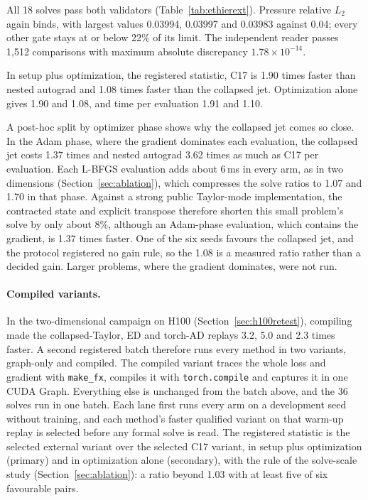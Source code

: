 \documentclass[11pt]{article}
\begin{document}
All 18 solves pass both validators (Table~\ref{tab:ethierext}). Pressure
relative $L_2$ again binds, with largest values 0.03994, 0.03997 and 0.03983
against 0.04; every other gate stays at or below 22\% of its limit. The
independent reader passes 1,512 comparisons with maximum absolute
discrepancy $1.78\times10^{-14}$.

In setup plus optimization, the registered statistic, C17 is 1.90 times
faster than nested autograd and 1.08 times faster than the collapsed jet.
Optimization alone gives 1.90 and 1.08, and time per evaluation 1.91 and
1.10.

A post-hoc split by optimizer phase shows why the collapsed jet comes so
close. In the Adam phase, where the gradient dominates each evaluation, the
collapsed jet costs 1.37 times and nested autograd 3.62 times as much as
C17 per evaluation. Each L-BFGS evaluation adds about 6\,ms in every arm,
as in two dimensions (Section~\ref{sec:ablation}), which compresses the
solve ratios to 1.07 and 1.70 in that phase. Against a strong public
Taylor-mode implementation, the contracted state and explicit transpose
therefore shorten this small problem's solve by only about 8\%, although
an Adam-phase evaluation, which contains the gradient, is 1.37 times
faster. One of the six seeds favours the collapsed jet, and the protocol
registered no gain rule, so the 1.08 is a measured ratio rather than a
decided gain. Larger problems, where the gradient dominates, were not run.

\paragraph{Compiled variants.}
In the two-dimensional campaign on H100 (Section~\ref{sec:h100retest}),
compiling made the collapsed-Taylor, ED and torch-AD replays 3.2, 5.0 and
2.3 times faster. A second registered batch therefore runs every method in
two variants, graph-only and compiled. The compiled variant traces the
whole loss and gradient with \texttt{make\_fx}, compiles it with
\texttt{torch.compile} and captures it in one CUDA Graph. Everything else
is unchanged from the batch above, and the 36 solves run in one batch.
Each lane first runs every arm on a development seed without training, and
each method's faster qualified variant on that warm-up replay is selected
before any formal solve is read. The registered statistic is the selected
external variant over the selected C17 variant, in setup plus optimization
(primary) and in optimization alone (secondary), with the rule of the
solve-scale study (Section~\ref{sec:ablation}): a ratio beyond 1.03 with at
least five of six favourable pairs.
\end{document}
